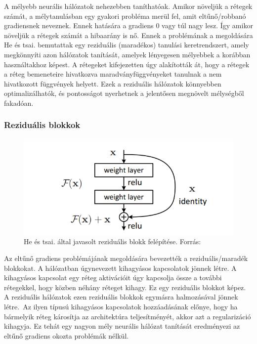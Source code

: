 \documentclass[12pt,a4]{article}
\begin{document}
    A mélyebb neurális hálózatok nehezebben taníthatóak. Amikor növeljük a rétegek számát, a mélytanulásban egy gyakori probléma merül fel, amit eltűnő/robbanó gradiensnek neveznek. Ennek hatására a gradiens 0 vagy túl nagy lesz. Így amikor növeljük a rétegek számát a hibaarány is nő. Ennek a problémának a megoldására \cite{resnet}He és tsai. bemutattak egy reziduális (maradékos) tanulási keretrendszert, amely megkönnyíti azon hálózatok tanítását, amelyek lényegesen mélyebbek a korábban használtakhoz képest. A rétegeket kifejezetten úgy alakították át, hogy a rétegek a réteg bemeneteire hivatkozva maradványfüggvényeket tanulnak a nem hivatkozott függvények helyett. Ezek a reziduális hálózatok könnyebben optimalizálhatók, és pontosságot nyerhetnek a jelentősen megnövelt mélységből fakadóan.

    \newpage
    \subsubsection{Reziduális blokkok}
    
    
    \begin{figure}[h]	
 		\centering
 		\includegraphics[width=1\linewidth]{Residual-Block}
 		\caption{He és tsai. által javasolt reziduális blokk felépítése.
 			Forrás:\cite{resnet}}
        \label{fig:resblock}
 	\end{figure}
  
    Az eltűnő gradiens problémájának megoldására bevezették a reziduális/maradék blokkokat. A hálózatban úgynevezett kihagyásos kapcsolatok jönnek létre. A kihagyásos kapcsolat egy réteg aktivációit úgy kapcsolja össze a további rétegekkel, hogy közben néhány réteget kihagy. Ez egy reziduális blokkot képez. A reziduális hálózatok ezen reziduális blokkok egymásra halmozásával jönnek létre. Az ilyen típusú kihagyásos kapcsolatok hozzáadásának előnye, hogy ha bármelyik réteg károsítja az architektúra teljesítményét, akkor azt a regularizáció kihagyja. Ez tehát egy nagyon mély neurális hálózat tanítását eredményezi az eltűnő gradiens okozta problémák nélkül. 
\end{document}
